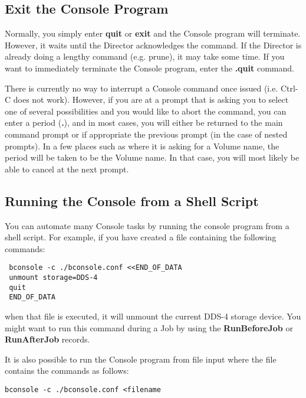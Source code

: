 \subsection{Exit the Console Program}

Normally, you simply enter {\bf quit} or {\bf exit} and the Console program
will terminate. However, it waits until the Director acknowledges the command.
If the Director is already doing a lengthy command (e.g. prune), it may take
some time. If you want to immediately terminate the Console program, enter the
{\bf .quit} command.

There is currently no way to interrupt a Console command once issued (i.e.
Ctrl-C does not work). However, if you are at a prompt that is asking you to
select one of several possibilities and you would like to abort the command,
you can enter a period ({\bf .}), and in most cases, you will either be
returned to the main command prompt or if appropriate the previous prompt (in
the case of nested prompts). In a few places such as where it is asking for a
Volume name, the period will be taken to be the Volume name. In that case, you
will most likely be able to cancel at the next prompt.


\subsection{Running the Console from a Shell Script}
\label{scripting}

You can automate many Console tasks by running the console program from a
shell script. For example, if you have created a file containing the following
commands:

\footnotesize
\begin{verbatim}
 bconsole -c ./bconsole.conf <<END_OF_DATA
 unmount storage=DDS-4
 quit
 END_OF_DATA
\end{verbatim}
\normalsize

when that file is executed, it will unmount the current DDS-4 storage device.
You might want to run this command during a Job by using the {\bf
RunBeforeJob} or {\bf RunAfterJob} records.

It is also possible to run the Console program from file input where the file
contains the commands as follows:

\footnotesize
\begin{verbatim}
bconsole -c ./bconsole.conf <filename
\end{verbatim}
\normalsize

